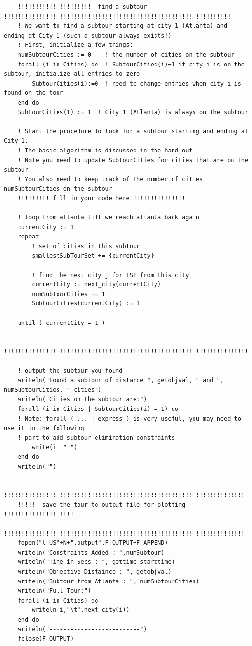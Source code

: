 \documentclass[twoside,12pt]{article}
\begin{document}
\begin{verbatim}
	!!!!!!!!!!!!!!!!!!!!!  find a subtour !!!!!!!!!!!!!!!!!!!!!!!!!!!!!!!!!!!!!!!!!!!!!!!!!!!!!!!!!!!!!!!!!
	! We want to find a subtour starting at city 1 (Atlanta) and ending at City 1 (such a subtour always exists!)
	! First, initialize a few things:
	numSubtourCities := 0    ! the number of cities on the subtour
	forall (i in Cities) do  ! SubtourCities(i)=1 if city i is on the subtour, initialize all entries to zero
		SubtourCities(i):=0  ! need to change entries when city i is found on the tour
	end-do
	SubtourCities(1) := 1  ! City 1 (Atlanta) is always on the subtour
		
	! Start the procedure to look for a subtour starting and ending at City 1. 
	! The basic algorithm is discussed in the hand-out
	! Note you need to update SubtourCities for cities that are on the subtour 
	! You also need to keep track of the number of cities numSubtourCities on the subtour
	!!!!!!!!! fill in your code here !!!!!!!!!!!!!!!
	
	! loop from atlanta till we reach atlanta back again
	currentCity := 1
	repeat
		! set of cities in this subtour
		smallestSubTourSet += {currentCity}
		
		! find the next city j for TSP from this city i
		currentCity := next_city(currentCity)
		numSubtourCities += 1
		SubtourCities(currentCity) := 1
				
	until ( currentCity = 1 )
	
	!!!!!!!!!!!!!!!!!!!!!!!!!!!!!!!!!!!!!!!!!!!!!!!!!!!!!!!!!!!!!!!!!!!!!!!!!!!!!!!!!!!!!!!!!!!!!!!!!!!!!!!!!
	
	! output the subtour you found
	writeln("Found a subtour of distance ", getobjval, " and ", numSubtourCities, " cities")
	writeln("Cities on the subtour are:")
	forall (i in Cities | SubtourCities(i) = 1) do
	! Note: forall ( ... | express ) is very useful, you may need to use it in the following 
	! part to add subtour elimination constraints
		write(i, " ")
	end-do
	writeln("")
	
	!!!!!!!!!!!!!!!!!!!!!!!!!!!!!!!!!!!!!!!!!!!!!!!!!!!!!!!!!!!!!!!!!!!!!
	!!!!!  save the tour to output file for plotting !!!!!!!!!!!!!!!!!!!!
	!!!!!!!!!!!!!!!!!!!!!!!!!!!!!!!!!!!!!!!!!!!!!!!!!!!!!!!!!!!!!!!!!!!!!
	fopen("l_US"+N+".output",F_OUTPUT+F_APPEND)
	writeln("Constraints Added : ",numSubtour)
	writeln("Time in Secs : ", gettime-starttime)
	writeln("Objective Distaince : ", getobjval)
	writeln("Subtour from Atlanta : ", numSubtourCities)
	writeln("Full Tour:")
	forall (i in Cities) do
		writeln(i,"\t",next_city(i))
	end-do
	writeln("--------------------------")
	fclose(F_OUTPUT)
	

\end{verbatim}
\end{document}

